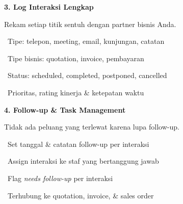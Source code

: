 \documentclass[a4paper]{article}
\begin{document}
\vspace{8pt}

\noindent
\begin{minipage}[t]{0.485\textwidth}
    \colorbox{EmeraldDark}{%
        \begin{minipage}{\dimexpr\textwidth-2\fboxsep\relax}
            {\fontsize{10}{13}\selectfont\bfseries\color{White} 3. Log Interaksi Lengkap}
        \end{minipage}}\par
    \vspace{4pt}
    {\fontsize{9}{12}\selectfont\color{TextDark}%
    Rekam setiap titik sentuh dengan partner bisnis Anda.\par\vspace{3pt}
    \textbullet\ Tipe: telepon, meeting, email, kunjungan, catatan\par\vspace{2pt}%
    \textbullet\ Tipe bisnis: quotation, invoice, pembayaran\par\vspace{2pt}%
    \textbullet\ Status: scheduled, completed, postponed, cancelled\par\vspace{2pt}%
    \textbullet\ Prioritas, rating kinerja \& ketepatan waktu}%
\end{minipage}%
\hfill
\begin{minipage}[t]{0.485\textwidth}
    \colorbox{PurplePrimary}{%
        \begin{minipage}{\dimexpr\textwidth-2\fboxsep\relax}
            {\fontsize{10}{13}\selectfont\bfseries\color{White} 4. Follow-up \& Task Management}
        \end{minipage}}\par
    \vspace{4pt}
    {\fontsize{9}{12}\selectfont\color{TextDark}%
    Tidak ada peluang yang terlewat karena lupa follow-up.\par\vspace{3pt}
    \textbullet\ Set tanggal \& catatan follow-up per interaksi\par\vspace{2pt}%
    \textbullet\ Assign interaksi ke staf yang bertanggung jawab\par\vspace{2pt}%
    \textbullet\ Flag \textit{needs follow-up} per interaksi\par\vspace{2pt}%
    \textbullet\ Terhubung ke quotation, invoice, \& sales order}%
\end{minipage}
\end{document}
